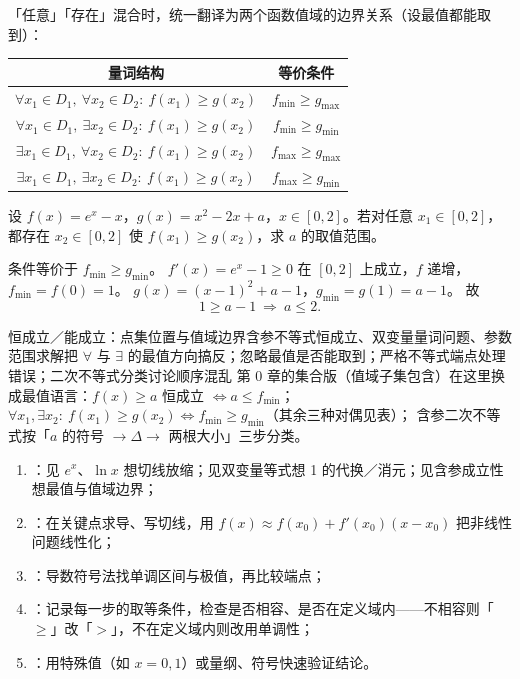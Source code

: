 \begin{explore}
「任意」「存在」混合时，统一翻译为两个函数值域的边界关系（设最值都能取到）：

\begin{center}\footnotesize\renewcommand{\arraystretch}{1.3}
\begin{tabular}{c|c}
量词结构 & 等价条件 \\\hline
$\forall x_1\in D_1,\ \forall x_2\in D_2:\ f(x_1)\ge g(x_2)$ & $f_{\min}\ge g_{\max}$ \\[2pt]
$\forall x_1\in D_1,\ \exists x_2\in D_2:\ f(x_1)\ge g(x_2)$ & $f_{\min}\ge g_{\min}$ \\[2pt]
$\exists x_1\in D_1,\ \forall x_2\in D_2:\ f(x_1)\ge g(x_2)$ & $f_{\max}\ge g_{\max}$ \\[2pt]
$\exists x_1\in D_1,\ \exists x_2\in D_2:\ f(x_1)\ge g(x_2)$ & $f_{\max}\ge g_{\min}$ \\
\end{tabular}
\end{center}

\begin{example}
设 $f(x)=e^x-x$，$g(x)=x^2-2x+a$，$x\in[0,2]$。若对任意 $x_1\in[0,2]$，都存在 $x_2\in[0,2]$ 使 $f(x_1)\ge g(x_2)$，求 $a$ 的取值范围。
\end{example}
\begin{solution}
条件等价于 $f_{\min}\ge g_{\min}$。
$f'(x)=e^x-1\ge0$ 在 $[0,2]$ 上成立，$f$ 递增，$f_{\min}=f(0)=1$。
$g(x)=(x-1)^2+a-1$，$g_{\min}=g(1)=a-1$。
故
\[
  1\ge a-1\ \Rightarrow\ a\le2 .
\]
\end{solution}

\begin{conccard}[二级]{恒成立／能成立：点集位置与值域边界}{含参不等式恒成立、双变量量词问题、参数范围求解}{把 $\forall$ 与 $\exists$ 的最值方向搞反；忽略最值是否能取到；严格不等式端点处理错误；二次不等式分类讨论顺序混乱}
第 0 章的集合版（值域子集包含）在这里换成最值语言：$f(x)\ge a$ 恒成立 $\iff a\le f_{\min}$；
$\forall x_1,\exists x_2:\ f(x_1)\ge g(x_2)\iff f_{\min}\ge g_{\min}$（其余三种对偶见表）；
含参二次不等式按「$a$ 的符号 $\to\Delta\to$ 两根大小」三步分类。
\end{conccard}

\begin{method}[局部线性化引擎的使用流程]
\begin{enumerate}
  \item {}：见 $e^x$、$\ln x$ 想切线放缩；见双变量等式想 1 的代换／消元；见含参成立性想最值与值域边界；
  \item {}：在关键点求导、写切线，用 $f(x)\approx f(x_0)+f'(x_0)(x-x_0)$ 把非线性问题线性化；
  \item {}：导数符号法找单调区间与极值，再比较端点；
  \item {}：记录每一步的取等条件，检查是否相容、是否在定义域内——不相容则「$\ge$」改「$>$」，不在定义域内则改用单调性；
  \item {}：用特殊值（如 $x=0,1$）或量纲、符号快速验证结论。
\end{enumerate}
\end{method}


\end{explore}
